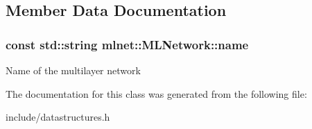 \subsection{Member Data Documentation}
\hypertarget{classmlnet_1_1_m_l_network_aa2e1496321423e15a8e97e0daed30ca7}{
\subsubsection[{name}]{\setlength{\rightskip}{0pt plus 5cm}const std\+::string mlnet\+::\+M\+L\+Network\+::name}}\label{classmlnet_1_1_m_l_network_aa2e1496321423e15a8e97e0daed30ca7}
Name of the multilayer network 

The documentation for this class was generated from the following file\+:\begin{DoxyCompactItemize}
\item 
include/datastructures.\+h\end{DoxyCompactItemize}
